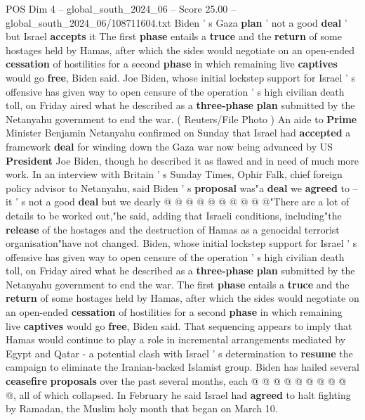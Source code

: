 \begin{textsample}{POS Dim 4 – global\_south\_2024\_06 – Score 25.00 – global\_south\_2024\_06/108711604.txt}  \label{ex:f4_pos_084}
Biden ' s Gaza \textbf{plan} ' not a good \textbf{deal} ' but Israel \textbf{accepts} it The first \textbf{phase} entails a \textbf{truce} and the \textbf{return} of some hostages held by Hamas, after which the sides would negotiate on an open-ended \textbf{cessation} of hostilities for a second \textbf{phase} in which remaining live \textbf{captives} would go \textbf{free}, Biden said.
Joe Biden, whose initial lockstep support for Israel ' s offensive has given way to open censure of the operation ' s high civilian death toll, on Friday aired what he described as a \textbf{three-phase} \textbf{plan} submitted by the Netanyahu government to end the war. ( Reuters/File Photo ) An aide to \textbf{Prime} Minister Benjamin Netanyahu confirmed on Sunday that Israel had \textbf{accepted} a framework \textbf{deal} for winding down the Gaza war now being advanced by US \textbf{President} Joe Biden, though he described it as flawed and in need of much more work.
In an interview with Britain ' s Sunday Times, Ophir Falk, chief foreign policy advisor to Netanyahu, said Biden ' s \textbf{proposal} was"a \textbf{deal} we \textbf{agreed} to -- it ' s not a good \textbf{deal} but we dearly @ @ @ @ @ @ @ @ @ @"There are a lot of details to be worked out,"he said, adding that Israeli conditions, including"the \textbf{release} of the hostages and the destruction of Hamas as a genocidal terrorist organisation"have not changed.
Biden, whose initial lockstep support for Israel ' s offensive has given way to open censure of the operation ' s high civilian death toll, on Friday aired what he described as a \textbf{three-phase} \textbf{plan} submitted by the Netanyahu government to end the war.
The first \textbf{phase} entails a \textbf{truce} and the \textbf{return} of some hostages held by Hamas, after which the sides would negotiate on an open-ended \textbf{cessation} of hostilities for a second \textbf{phase} in which remaining live \textbf{captives} would go \textbf{free}, Biden said.
That sequencing appears to imply that Hamas would continue to play a role in incremental arrangements mediated by Egypt and Qatar - a potential clash with Israel ' s determination to \textbf{resume} the campaign to eliminate the Iranian-backed Islamist group.
Biden has hailed several \textbf{ceasefire} \textbf{proposals} over the past several months, each @ @ @ @ @ @ @ @ @ @, all of which collapsed.
In February he said Israel had \textbf{agreed} to halt fighting by Ramadan, the Muslim holy month that began on March 10.

\end{textsample}
